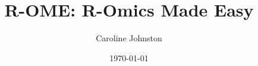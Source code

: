 \documentclass[a4paper]{report}
\begin{document}
\title{R-OME: R-Omics Made Easy}
\author{Caroline Johnston}
\date{\today}
\maketitle


\tableofcontents



















\end{document}
